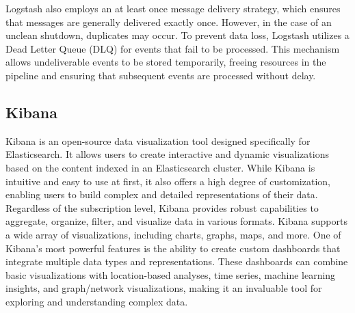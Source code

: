 Logstash also employs an at least once message delivery strategy, which ensures that messages are generally delivered exactly once.
However, in the case of an unclean shutdown, duplicates may occur. 
To prevent data loss, Logstash utilizes a Dead Letter Queue (DLQ) for events that fail to be processed. 
This mechanism allows undeliverable events to be stored temporarily, freeing resources in the pipeline and ensuring that subsequent events are processed without delay.

\subsection{Kibana}
Kibana is an open-source data visualization tool designed specifically for Elasticsearch. 
It allows users to create interactive and dynamic visualizations based on the content indexed in an Elasticsearch cluster. 
While Kibana is intuitive and easy to use at first, it also offers a high degree of customization, enabling users to build complex and detailed representations of their data.
Regardless of the subscription level, Kibana provides robust capabilities to aggregate, organize, filter, and visualize data in various formats.
Kibana supports a wide array of visualizations, including charts, graphs, maps, and more. 
One of Kibana's most powerful features is the ability to create custom dashboards that integrate multiple data types and representations.
These dashboards can combine basic visualizations with location-based analyses, time series, machine learning insights, and graph/network visualizations, making it an invaluable tool for exploring and understanding complex data.